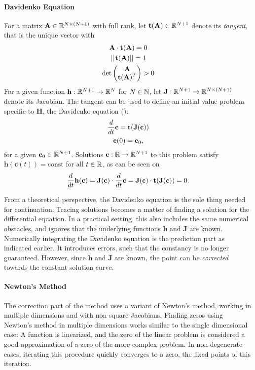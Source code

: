\paragraph{Davidenko Equation} For a matrix $\mathbf A \in \mathbb{R}^{N \times (N+1)}$ with full rank, let $\operatorname{\mathbf{t}}(\mathbf A) \in \mathbb{R}^{N+1}$ denote its \emph{tangent}, that is the unique vector with
	\begin{gather*}
		\mathbf A \cdot \operatorname{\mathbf{t}}(\mathbf A) = 0\\
		||\operatorname{\mathbf{t}}(\mathbf A)|| = 1\\
		\det \begin{pmatrix}
			\mathbf A\\
			\operatorname{\mathbf{t}}(\mathbf A)^T
		\end{pmatrix} > 0
	\end{gather*}
For a given function $\mathbf h: \mathbb{R}^{N+1} \to \mathbb{R}^N$ for $N \in \mathbb{N}$, let $\mathbf J: \mathbb{R}^{N+1} \to \mathbb{R}^{N \times (N+1)}$ denote its Jacobian.
The tangent can be used to define an initial value problem specific to $\mathbf H$, the Davidenko equation (\cite{davidenko1953new}): %
	\begin{gather*}
		\frac{d}{dt}\mathbf c = \operatorname{\mathbf{t}}(\mathbf J(\mathbf c))\\
		\mathbf c(0) = \mathbf c_0 \text,
	\end{gather*}
for a given $\mathbf c_0 \in \mathbb{R}^{N+1}$.
Solutions $\mathbf c: \mathbb{R} \to \mathbb{R}^{N+1}$ to this problem satisfy $\mathbf h(\mathbf c(t)) = \text{const}$ for all $t \in \mathbb{R}$, as can be seen on
	\[
		\frac{d}{dt} \mathbf h(\mathbf c) = \mathbf J(\mathbf c) \cdot \frac{d}{dt} \mathbf c = \mathbf J(\mathbf c) \cdot \operatorname{\mathbf{t}}(\mathbf J(\mathbf c)) = 0 \text.
	\]

From a theoretical perspective, the Davidenko equation is the sole thing needed for continuation.
Tracing solutions becomes a matter of finding a solution for the differential equation.
In a practical setting, this also includes the same numerical obstacles, and ignores that the underlying functions $\mathbf h$ and $\mathbf J$ are known.
Numerically integrating the Davidenko equation is the prediction part as indicated earlier.
It introduces errors, such that the constancy is no longer guaranteed.
However, since $\mathbf h$ and $\mathbf J$ are known, the point can be \emph{corrected} towards the constant solution curve.

\paragraph{Newton's Method} The correction part of the method uses a variant of Newton's method, working in multiple dimensions and with non-square Jacobians.
Finding zeros using Newton's method in multiple dimensions works similar to the single dimensional case: A function is linearized, and the zero of the linear problem is considered a good approximation of a zero of the more complex problem.
In non-degenerate cases, iterating this procedure quickly converges to a zero, the fixed points of this iteration.

